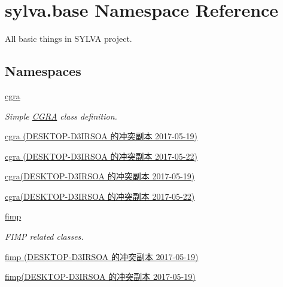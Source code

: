 \hypertarget{namespacesylva_1_1base}{}\section{sylva.\+base Namespace Reference}
\label{namespacesylva_1_1base}


All basic things in S\+Y\+L\+VA project.  


\subsection*{Namespaces}
\begin{DoxyCompactItemize}
\item 
 \hyperlink{namespacesylva_1_1base_1_1cgra}{cgra}
\begin{DoxyCompactList}\small\item\em Simple \hyperlink{classsylva_1_1base_1_1cgra_1_1_c_g_r_a}{C\+G\+RA} class definition. \end{DoxyCompactList}\item 
 \hyperlink{namespacesylva_1_1base_1_1cgra_01_07_d_e_s_k_t_o_p-_d3_i_r_s_o_a_01的冲突副本_012017-05-19_08}{cgra (\+D\+E\+S\+K\+T\+O\+P-\/\+D3\+I\+R\+S\+O\+A 的冲突副本 2017-\/05-\/19)}
\item 
 \hyperlink{namespacesylva_1_1base_1_1cgra_01_07_d_e_s_k_t_o_p-_d3_i_r_s_o_a_01的冲突副本_012017-05-22_08}{cgra (\+D\+E\+S\+K\+T\+O\+P-\/\+D3\+I\+R\+S\+O\+A 的冲突副本 2017-\/05-\/22)}
\item 
 \hyperlink{namespacesylva_1_1base_1_1cgra_07_d_e_s_k_t_o_p-_d3_i_r_s_o_a_01的冲突副本_012017-05-19_08}{cgra(\+D\+E\+S\+K\+T\+O\+P-\/\+D3\+I\+R\+S\+O\+A 的冲突副本 2017-\/05-\/19)}
\item 
 \hyperlink{namespacesylva_1_1base_1_1cgra_07_d_e_s_k_t_o_p-_d3_i_r_s_o_a_01的冲突副本_012017-05-22_08}{cgra(\+D\+E\+S\+K\+T\+O\+P-\/\+D3\+I\+R\+S\+O\+A 的冲突副本 2017-\/05-\/22)}
\item 
 \hyperlink{namespacesylva_1_1base_1_1fimp}{fimp}
\begin{DoxyCompactList}\small\item\em F\+I\+MP related classes. \end{DoxyCompactList}\item 
 \hyperlink{namespacesylva_1_1base_1_1fimp_01_07_d_e_s_k_t_o_p-_d3_i_r_s_o_a_01的冲突副本_012017-05-19_08}{fimp (\+D\+E\+S\+K\+T\+O\+P-\/\+D3\+I\+R\+S\+O\+A 的冲突副本 2017-\/05-\/19)}
\item 
 \hyperlink{namespacesylva_1_1base_1_1fimp_07_d_e_s_k_t_o_p-_d3_i_r_s_o_a_01的冲突副本_012017-05-19_08}{fimp(\+D\+E\+S\+K\+T\+O\+P-\/\+D3\+I\+R\+S\+O\+A 的冲突副本 2017-\/05-\/19)}

\end{DoxyCompactItemize}
